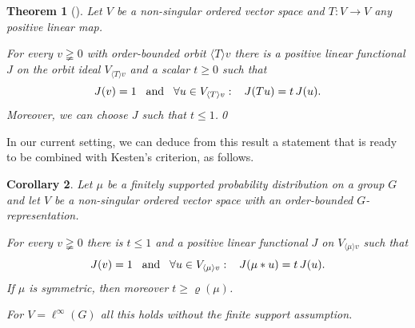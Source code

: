 \documentclass[11pt]{amsart}
\numberwithin{equation}{section}
\newtheorem{thm}{Theorem}[section]
\newtheorem{cor}[thm]{Corollary}
\theoremstyle{definition}
\theoremstyle{definition}
\begin{document}
\begin{thm}[\cite{Monod_eigenform_pre}]\label{thm:KR}
Let $V$ be a non-singular ordered vector space and $T\colon V\to V$ any positive linear map.

For every $v\gneqq 0$ with order-bounded orbit $\langle T\rangle v$ there is a positive linear functional $J$ on the orbit ideal $V_{\langle T\rangle v}$ and a scalar $t \geq 0$ such that
\begin{equation*}
J(v)=1 \kern3mm \text{and} \kern3mm \forall u\in V_{\langle T\rangle v} : \kern3mm J(T u) = t\, J(u).
\end{equation*}
Moreover, we can choose $J$ such that $t\leq 1$.\qed
\end{thm}

In our current setting, we can deduce from this result a statement that is ready to be combined with Kesten's criterion, as follows.

\begin{cor}\label{cor:KR-for-mu}
Let $\mu$ be a finitely supported probability distribution on a group $G$ and let $V$ be a non-singular ordered vector space with an order-bounded $G$-representation.

For every $v\gneqq 0$ there is $t\leq 1$ and a positive linear functional $J$ on $V_{\langle \mu \rangle v}$ such that
\begin{equation*}
J(v)=1 \kern3mm \text{and} \kern3mm \forall u\in V_{\langle \mu \rangle v} : \kern3mm J(\mu * u) = t\, J(u).
\end{equation*}
If $\mu$ is symmetric, then moreover $t\geq  \varrho(\mu)$.

For $V=\ell^\infty(G)$ all this holds without the finite support assumption.
\end{cor}
\end{document}
